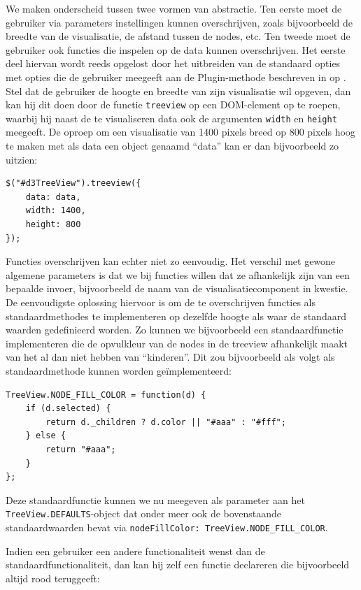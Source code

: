We maken onderscheid tussen twee vormen van abstractie. Ten eerste moet de
gebruiker via parameters instellingen kunnen overschrijven, zoals bijvoorbeeld
de breedte van de visualisatie, de afstand tussen de nodes, etc. Ten tweede moet
de gebruiker ook functies die inspelen op de data kunnen overschrijven. Het
eerste deel hiervan wordt reeds opgelost door het uitbreiden van de standaard
opties met opties die de gebruiker meegeeft aan de Plugin-methode beschreven in
 op . Stel dat de gebruiker de hoogte
en breedte van zijn visualisatie wil opgeven, dan kan hij dit doen door de
functie \texttt{treeview} op een DOM-element op te roepen, waarbij hij naast de
te visualiseren data ook de argumenten \texttt{width} en \texttt{height}
meegeeft. De oproep om een visualisatie van 1400 pixels breed op 800 pixels hoog
te maken met als data een object genaamd ``data'' kan er dan bijvoorbeeld zo
uitzien:

\begin{lstlisting}
$("#d3TreeView").treeview({
    data: data,
    width: 1400,
    height: 800
});
\end{lstlisting}

Functies overschrijven kan echter niet zo eenvoudig. Het verschil met gewone
algemene parameters is dat we bij functies willen dat ze afhankelijk zijn van
een bepaalde invoer, bijvoorbeeld de naam van de visualisatiecomponent in
kwestie. De eenvoudigste oplossing hiervoor is om de te overschrijven functies
als standaardmethodes te implementeren op dezelfde hoogte als waar de standaard
waarden gedefinieerd worden. Zo kunnen we bijvoorbeeld een standaardfunctie
implementeren die de opvulkleur van de nodes in de treeview afhankelijk maakt
van het al dan niet hebben van ``kinderen''. Dit zou bijvoorbeeld als volgt als
standaardmethode kunnen worden geïmplementeerd:

\begin{lstlisting}
TreeView.NODE_FILL_COLOR = function(d) {
    if (d.selected) {
        return d._children ? d.color || "#aaa" : "#fff";
    } else {
        return "#aaa";
    }
};
\end{lstlisting}

Deze standaardfunctie kunnen we nu meegeven als parameter aan het
\texttt{TreeView.DEFAULTS}-object dat onder meer ook de bovenstaande
standaardwaarden bevat via \texttt{nodeFillColor: TreeView.NODE\_FILL\_COLOR}.

Indien een gebruiker een andere functionaliteit wenst dan de
standaardfunctionaliteit, dan kan hij zelf een functie declareren die
bijvoorbeeld altijd rood teruggeeft:

